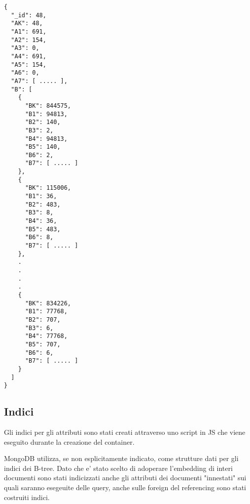 \begin{Verbatim}[frame=single,framesep=2mm,label= Embedding di B in A,labelposition=all]
{
  "_id": 48,
  "AK": 48,
  "A1": 691,
  "A2": 154,
  "A3": 0,
  "A4": 691,
  "A5": 154,
  "A6": 0,
  "A7": [ ..... ],
  "B": [
    {
      "BK": 844575,
      "B1": 94813,
      "B2": 140,
      "B3": 2,
      "B4": 94813,
      "B5": 140,
      "B6": 2,
      "B7": [ ..... ]
    },
    {
      "BK": 115006,
      "B1": 36,
      "B2": 483,
      "B3": 8,
      "B4": 36,
      "B5": 483,
      "B6": 8,
      "B7": [ ..... ]
    },
    .
    .
    .
    .
    {
      "BK": 834226,
      "B1": 77768,
      "B2": 707,
      "B3": 6,
      "B4": 77768,
      "B5": 707,
      "B6": 6,
      "B7": [ ..... ]
    }
  ]
}
\end{Verbatim}

\subsection{Indici}

Gli indici per gli attributi sono stati creati attraverso uno script in JS che viene eseguito durante la creazione del container.

MongoDB utilizza, se non esplicitamente indicato, come strutture dati per gli indici dei B-tree. Dato che e' stato scelto di adoperare l'embedding di interi documenti sono stati 
indicizzati anche gli attributi dei documenti "innestati" sui quali saranno esegeuite delle query, anche sulle foreign del referencing sono stati costruiti indici.

